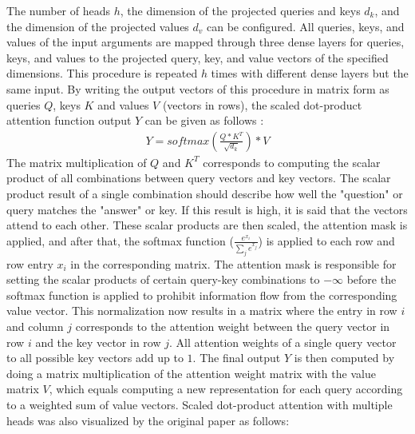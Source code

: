 \documentclass[draft,final]{vutinfth} %
\begin{document}
The number of heads $h$, the dimension of the projected queries and keys $d_k$, and the dimension of the projected values $d_v$ can be configured.
All queries, keys, and values of the input arguments are mapped through three dense layers for queries, keys, and values to the projected query, key, and value vectors of the specified dimensions.
This procedure is repeated $h$ times with different dense layers but the same input.
By writing the output vectors of this procedure in matrix form as queries $Q$, keys $K$ and values $V$ (vectors in rows), the scaled dot-product attention function output $Y$ can be given as follows \cite[p. 4]{Transformer}:
\begin{align}
\label{sdpa}
Y = softmax \left( \frac{Q * K^T}{\sqrt{d_k}} \right) * V
\end{align}
The matrix multiplication of $Q$ and $K^T$ corresponds to computing the scalar product of all combinations between query vectors and key vectors.
The scalar product result of a single combination should describe how well the "question" or query matches the "answer" or key.
If this result is high, it is said that the vectors attend to each other.
These scalar products are then scaled, the attention mask is applied, and after that, the softmax function ($\frac{e^{x_i}}{\sum_j{e^{x_j}}}$) is applied to each row and row entry $x_i$ in the corresponding matrix.
The attention mask is responsible for setting the scalar products of certain query-key combinations to $-\infty$ before the softmax function is applied to prohibit information flow from the corresponding value vector.
This normalization now results in a matrix where the entry in row $i$ and column $j$ corresponds to the attention weight between the query vector in row $i$ and the key vector in row $j$.
All attention weights of a single query vector to all possible key vectors add up to $1$.
The final output $Y$ is then computed by doing a matrix multiplication of the attention weight matrix with the value matrix $V$, which equals computing a new representation for each query according to a weighted sum of value vectors.
Scaled dot-product attention with multiple heads was also visualized by the original paper as follows:
\end{document}
